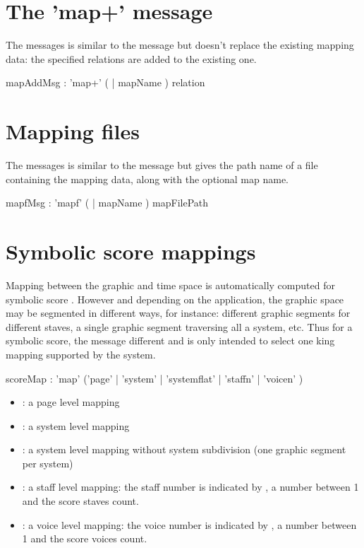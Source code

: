 \documentclass[a4paper,twoside]{report}
\newcommand{\sublevel}[1]	{\section{#1}}
\begin{document}
\sublevel{The 'map+' message}
\label{mapAddMsg}
The  messages is similar to the  message but doesn't replace the existing mapping data: the specified relations are added to the existing one.


\begin{rail}
mapAddMsg : 'map+' ( | mapName ) relation
\end{rail}

\sublevel{Mapping files}
\label{mapFileMsg}
The  messages is similar to the  message but gives the path name of a file containing the mapping data, along with the optional map name.


\begin{rail}
mapfMsg : 'mapf' ( | mapName ) mapFilePath
\end{rail}


\sublevel{Symbolic score mappings}
\label{guidomap}

Mapping between the graphic and time space is automatically computed for symbolic score . However and depending on the application, the graphic space may be segmented in different ways, for instance: different graphic segments for different staves, a single graphic segment traversing all a system, etc. Thus for a symbolic score, the  message different and is only intended to select one king mapping supported by the system.


\begin{rail}
scoreMap : 'map' ('page' | 'system' | 'systemflat' | 'staffn' | 'voicen' )
\end{rail}

\begin{itemize}
\item {}: a page level mapping
\item {}: a system level mapping
\item {}: a system level mapping without system subdivision (one graphic segment per system)
\item {}: a staff level mapping: the staff number is indicated by , a number between 1 and the score staves count.
\item {}: a voice level mapping: the voice number is indicated by , a number between 1 and the score voices count.
\end{itemize}
\end{document}
